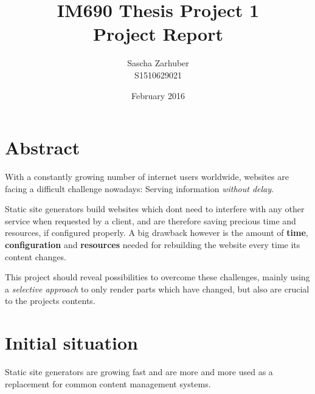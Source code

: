 \documentclass[a4paper,english,11pt]{report}
\author{Sascha Zarhuber\\ S1510629021}
\title{IM690 Thesis Project 1\\ Project Report}
\date{February 2016}
\begin{document}
\maketitle
\tableofcontents

\chapter*{Abstract} %

With a constantly growing number of internet users worldwide, websites are facing a difficult challenge nowadays: Serving information \emph{without delay}.

Static site generators build websites which don\textquotesingle t need to interfere with any other service when requested by a client, and are therefore saving precious time and resources, if configured properly. A big drawback however is the amount of \textbf{time}, \textbf{configuration} and \textbf{resources} needed for rebuilding the website every time its content changes.

This project should reveal possibilities to overcome these challenges, mainly using a \emph{selective approach} to only render parts which have changed, but also are crucial to the project\textquotesingle s contents.


\chapter{Initial situation}

Static site generators are growing fast and are more and more used as a replacement for common content management systems.
\end{document}

